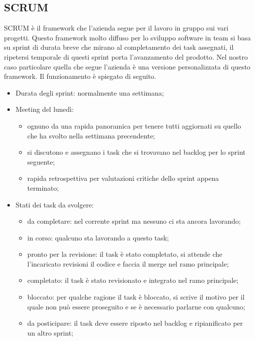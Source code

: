 \subsection*{SCRUM}
SCRUM è il framework che l'azienda segue per il lavoro in gruppo sui vari progetti. Questo framework molto diffuso per lo sviluppo software in
team si basa su sprint di durata breve che mirano al completamento dei task assegnati, il ripetersi temporale di questi sprint porta l'avanzamento
del prodotto. Nel nostro caso particolare quella che segue l'azienda è una versione personalizzata di questo framework. Il funzionamento è spiegato di seguito. \newline
\begin{itemize}
  \item Durata degli sprint: normalmente una settimana;
  \item Meeting del lunedì:
        \begin{itemize}
          \item ognuno da una rapida panoramica per tenere tutti aggiornati su quello che ha svolto nella settimana precendente;
          \item si discutono e assegnano i task che si trovavano nel backlog per lo sprint seguente;
          \item rapida retrospettiva per valutazioni critiche dello sprint appena terminato;
        \end{itemize}
  \item Stati dei task da svolgere:
        \begin{itemize}
          \item da completare: nel corrente sprint ma nessuno ci sta ancora lavorando;
          \item in corso: qualcuno sta lavorando a questo task;
          \item pronto per la revisione: il task è stato completato, si attende che l'incaricato revisioni il codice e faccia il merge nel ramo principale;
          \item completato: il task è stato revisionato e integrato nel ramo principale;
          \item bloccato: per qualche ragione il task è bloccato, si scrive il motivo per il quale non può essere proseguito e se è necessario parlarne con qualcuno;
          \item da posticipare: il task deve essere riposto nel backlog e ripianificato per un altro sprint;
        \end{itemize}
\end{itemize}

